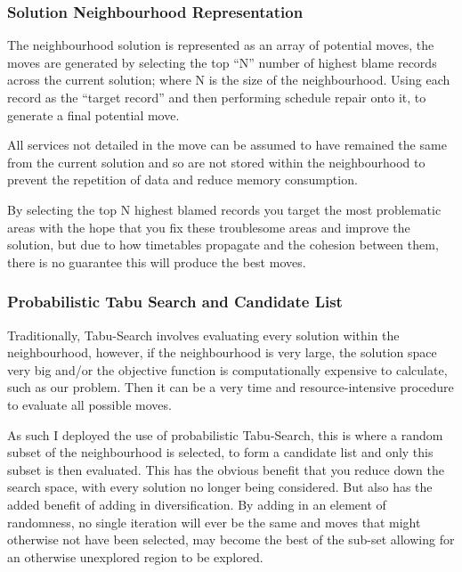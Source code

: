 \documentclass{article}
\begin{document}
\subsubsection{Solution Neighbourhood Representation}

The neighbourhood solution is represented as an array of potential moves, the moves are generated by selecting the top ``N'' number of highest blame records across the current solution; where N is the size of the neighbourhood. Using each record as the ``target record'' and then performing schedule repair onto it, to generate a final potential move.

\par 
All services not detailed in the move can be assumed to have remained the same from the current solution and so are not stored within the neighbourhood to prevent the repetition of data and reduce memory consumption. 


\par 
By selecting the top N highest blamed records you target the most problematic areas with the hope that you fix these troublesome areas and improve the solution, but due to how timetables propagate and the cohesion between them, there is no guarantee this will produce the best moves.



\subsubsection{Probabilistic Tabu Search and Candidate List}

Traditionally, Tabu-Search involves evaluating every solution within the neighbourhood, however, if the neighbourhood is very large, the solution space very big and/or the objective function is computationally expensive to calculate, such as our problem. Then it can be a very time and resource-intensive procedure to evaluate all possible moves. 

\par 
As such I deployed the use of probabilistic Tabu-Search, this is where a random subset of the neighbourhood is selected, to form a candidate list and only this subset is then evaluated. This has the obvious benefit that you reduce down the search space, with every solution no longer being considered. But also has the added benefit of adding in diversification. By adding in an element of randomness, no single iteration will ever be the same and moves that might otherwise not have been selected, may become the best of the sub-set allowing for an otherwise unexplored region to be explored. 
\end{document}
